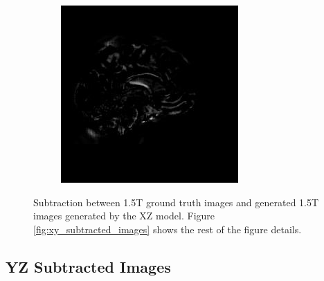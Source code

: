 \documentclass[11pt, fleqn, titlepage]{article}
\newcommand\skipperer{0.45pt}
\newcommand{\1}[1]{\mathds{1}\left[#1\right]}
\begin{document}
\begin{figure}[H]
\begin{subfigure}[b]{0.8\textwidth}
		\hskip\skipperer
		\includegraphics[width=0.22\linewidth]{imgs/subtracted_images/xz/136_S_0196_yz_1.5_1.5gen_comparison}
	\end{subfigure}
	\caption{Subtraction between 1.5T ground truth images and generated 1.5T images generated by the XZ model. Figure \ref{fig:xy_subtracted_images} shows the rest of the figure details.}
	\label{fig:xz_subtracted_images}
\end{figure}

\subsection{YZ Subtracted Images}\label{yz_subtracted_images}
\end{document}
